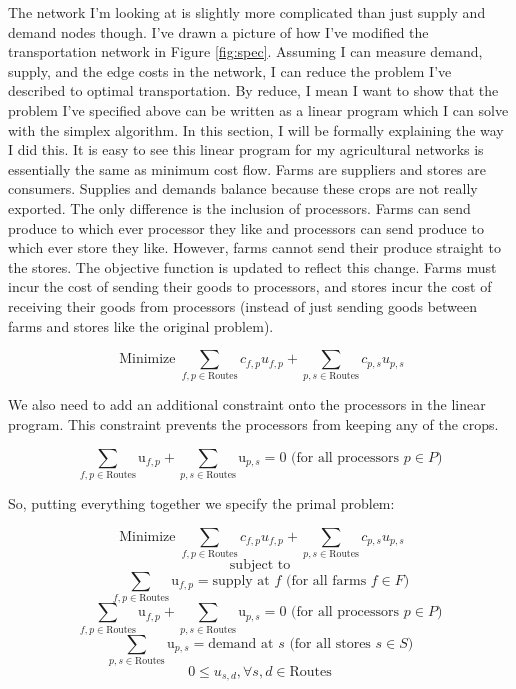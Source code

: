 \documentclass{report}
\begin{document}

The network I'm looking at is slightly more complicated than just supply and demand nodes though. I've drawn a picture of how I've modified the transportation network in Figure \ref{fig:spec}. Assuming I can measure demand, supply, and the edge costs in the network, I can reduce the problem I've described to optimal transportation. By reduce, I mean I want to show that the problem I've specified above can be  written as a linear program which I can solve with the simplex algorithm. In this section, I will be formally explaining the way I did this. It is easy to see this linear program for my agricultural networks is essentially the same as minimum cost flow. Farms are suppliers and stores are consumers. Supplies and demands balance because these crops are not really exported. The only difference is the inclusion of processors. Farms can send produce to which ever processor they like and processors can send produce to which ever store they like. However, farms cannot send their produce straight to the stores. The objective function is updated to reflect this change. Farms must incur the cost of sending their goods to processors, and stores incur the cost of receiving their goods from processors (instead of just sending goods between farms and stores like the original problem).

$$\operatorname{Minimize} \sum_{f,p \in \text{Routes}} c_{f,p} u_{f,p} + \sum_{p,s \in \text{Routes}} c_{p,s} u_{p,s}$$

We also need to add an additional constraint onto the processors in the linear program. This constraint prevents the processors from keeping any of the crops.

$$\sum_{f,p \in \text{Routes}} \text{u}_{f,p} + \sum_{p,s \in \text{Routes}} \text{u}_{p,s} = 0 \text{ (for all processors } p \in P)$$

So, putting everything together we specify the primal problem:

$$\operatorname{Minimize} \sum_{f,p \in \text{Routes}} c_{f,p} u_{f,p} + \sum_{p,s \in \text{Routes}} c_{p,s} u_{p,s}$$
$$\text{subject to}$$
$$\sum_{f,p \in \text{Routes}} \text{u}_{f,p}= \text{supply at } f \text{ (for all farms } f \in F)$$
$$\sum_{f,p \in \text{Routes}} \text{u}_{f,p} + \sum_{p,s \in \text{Routes}} \text{u}_{p,s} = 0 \text{ (for all processors } p \in P)$$
$$\sum_{p,s \in \text{Routes}} \text{u}_{p,s}= \text{demand at } s \text{ (for all stores } s \in S)$$
$$0 \leq u_{s,d}, \forall s,d \in \text{Routes}$$
\end{document}
